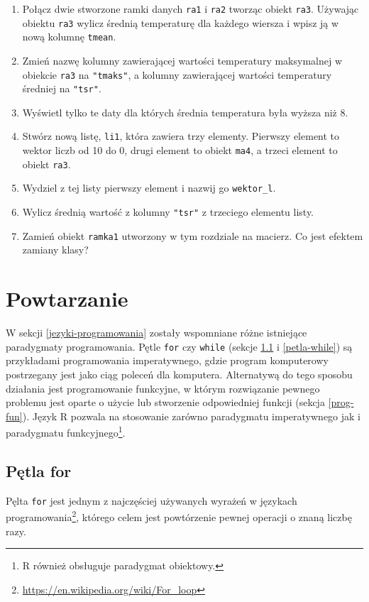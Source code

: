 \documentclass[paper=6in:9in,pagesize=pdftex,headinclude=on,footinclude=on,10pt]{scrbook}
\begin{document}
\begin{enumerate}
\item
  Połącz dwie stworzone ramki danych \texttt{ra1} i \texttt{ra2} tworząc obiekt \texttt{ra3}.
  Używając obiektu \texttt{ra3} wylicz średnią temperaturę dla każdego wiersza i wpisz ją w nową kolumnę \texttt{tmean}.
\item
  Zmień nazwę kolumny zawierającej wartości temperatury maksymalnej w obiekcie \texttt{ra3} na \texttt{"tmaks"}, a kolumny zawierającej wartości temperatury średniej na \texttt{"tsr"}.
\item
  Wyświetl tylko te daty dla których średnia temperatura była wyższa niż 8.
\item
  Stwórz nową listę, \texttt{li1}, która zawiera trzy elementy.
  Pierwszy element to wektor liczb od 10 do 0, drugi element to obiekt \texttt{ma4}, a trzeci element to obiekt \texttt{ra3}.
\item
  Wydziel z tej listy pierwszy element i nazwij go \texttt{wektor\_l}.
\item
  Wylicz średnią wartość z kolumny \texttt{"tsr"} z trzeciego elementu listy.
\item
  Zamień obiekt \texttt{ramka1} utworzony w tym rozdziale na macierz.
  Co jest efektem zamiany klasy?
\end{enumerate}

\hypertarget{petle}{%
\chapter{Powtarzanie}\label{petle}}

W sekcji \ref{jezyki-programowania} zostały wspomniane różne istniejące paradygmaty programowania.
Pętle \texttt{for} czy \texttt{while} (sekcje \ref{petla-for} i \ref{petla-while}) są przykładami programowania imperatywnego, gdzie program komputerowy postrzegany jest jako ciąg poleceń dla komputera.
Alternatywą do tego sposobu działania jest programowanie funkcyjne, w którym rozwiązanie pewnego problemu jest oparte o użycie lub stworzenie odpowiedniej funkcji (sekcja \ref{prog-fun}).
Język R pozwala na stosowanie zarówno paradygmatu imperatywnego jak i paradygmatu funkcyjnego\footnote{R również obsługuje paradygmat obiektowy.}.

\hypertarget{petla-for}{%
\section{Pętla for}\label{petla-for}}

Pęlta \texttt{for} jest jednym z najczęściej używanych wyrażeń w językach programowania\footnote{\url{https://en.wikipedia.org/wiki/For_loop}}, którego celem jest powtórzenie pewnej operacji o znaną liczbę razy.
\end{document}
